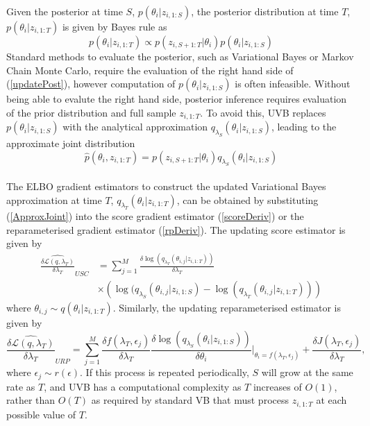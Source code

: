 \documentclass[12pt,a4paper]{article}\usepackage[]{graphicx}\usepackage[]{color}
\begin{document}
{Given the posterior at time $S$, $p(\theta_{i} | z_{i, 1:S})$, the posterior distribution at time $T$, $p(\theta_{i} | z_{i, 1:T})$ is given by Bayes rule as
\begin{equation}
\label{updatePost}
p(\theta_{i} | z_{i, 1:T}) \propto p(z_{i, S+1:T} | \theta_{i})p(\theta_{i} | z_{i, 1:S})
\end{equation}
Standard methods to evaluate the posterior, such as Variational Bayes or Markov Chain Monte Carlo, require the evaluation of the right hand side of (\ref{updatePost}), however computation of $p(\theta_{i} | z_{i, 1:S})$ is often infeasible. Without being able to evalute the right hand side, posterior inference requires evaluation of the prior distribution and full sample $z_{i, 1:T}$. To avoid this, UVB replaces $p(\theta_{i} | z_{i, 1:S})$ with the analytical approximation $q_{\lambda_S}(\theta_{i} | z_{i, 1:S})$, leading to the approximate joint distribution
\begin{equation}
\label{ApproxJoint}
\hat{p}(\theta_{i},  z_{i, 1:T}) = p(z_{i, S+1:T} | \theta_{i})q_{\lambda_S}(\theta_{i} | z_{i, 1:S})
\end{equation}
\\

The ELBO gradient estimators to construct the updated Variational Bayes approximation at time $T$, $q_{\lambda_T}(\theta_{i} | z_{i, 1:T})$, can be obtained by substituting (\ref{ApproxJoint}) into the score gradient estimator (\ref{scoreDeriv}) or the reparameterised gradient estimator (\ref{rpDeriv}). The updating score estimator is given by
\begin{align}
\widehat{\frac{\delta\mathcal{L}(q, \lambda_T)}{\delta \lambda_T}}_{USC} &= \sum_{j = 1}^M \frac{\delta \log(q_{\lambda_T}(\theta_{i, j} | z_{i, 1:T}))}{\delta \lambda_T} \nonumber \\
&\times \left(\log(q_{\lambda_S}(\theta_{i, j} | z_{i, 1:S}) - \log(q_{\lambda_T}(\theta_{i, j} | z_{i, 1:T})) \right) \label{scoreUpdate}
\end{align}
where $\theta_{i, j} \sim q(\theta_{i} | z_{i, 1:T})$. Similarly, the updating reparameterised estimator is given by
\begin{equation}
\label{rpUpdate}
\widehat{\frac{\delta\mathcal{L}(q, \lambda_T)}{\delta \lambda_T}}_{URP} = \sum_{j = 1}^M \frac{\delta f(\lambda_T, \epsilon_j)}{\delta \lambda_T} \frac{\delta \log(q_{\lambda_S}(\theta_{i} |z_{i, 1:S}))}{\delta \theta_{i}} \bigg\rvert_{\theta_{i} = f(\lambda_T, \epsilon_j)} + \frac{\delta J(\lambda_T, \epsilon_j)}{\delta \lambda_T},
\end{equation}
where $\epsilon_j \sim r(\epsilon)$. If this process is repeated periodically, $S$ will grow at the same rate as $T$, and UVB has a computational complexity as $T$ increases of $O(1)$, rather than $O(T)$ as required by standard VB that must process $z_{i, 1:T}$ at each possible value of $T$. 

}
\end{document}
